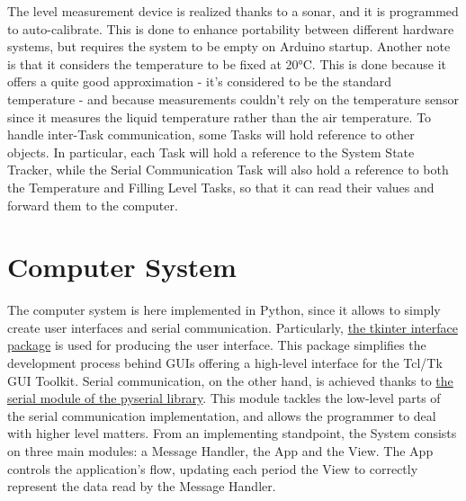 \documentclass[a4paper,12pt]{report}
\begin{document}
	\newline The level measurement device is realized thanks to a sonar, and it is programmed to auto-calibrate. This is done to enhance portability between different hardware systems, but requires the system to be empty on Arduino startup. Another note is that it considers the temperature to be fixed at 20°C. This is done because it offers a quite good approximation - it's considered to be the standard temperature - and because measurements couldn't rely on the temperature sensor since it measures the liquid temperature rather than the air temperature.
	\newline To handle inter-Task communication, some Tasks will hold reference to other objects. In particular, each Task will hold a reference to the System State Tracker, while the Serial Communication Task will also hold a reference to both the Temperature and Filling Level Tasks, so that it can read their values and forward them to the computer.
	
	\section{Computer System}
	The computer system is here implemented in Python, since it allows to simply create user interfaces and serial communication.\newline
	Particularly, \href{https://docs.python.org/3/library/tkinter.html}{the tkinter interface package} is used for producing the user interface. This package simplifies the development process behind GUIs offering a high-level interface for the Tcl/Tk GUI Toolkit.\newline
	Serial communication, on the other hand, is achieved thanks to \href{https://pyserial.readthedocs.io/en/latest/}{the serial module of the pyserial library}. This module tackles the low-level parts of the serial communication implementation, and allows the programmer to deal with higher level matters.\newline
	From an implementing standpoint, the System consists on three main modules: a Message Handler, the App and the View. The App controls the application's flow, updating each period the View to correctly represent the data read by the Message Handler.
\end{document}
